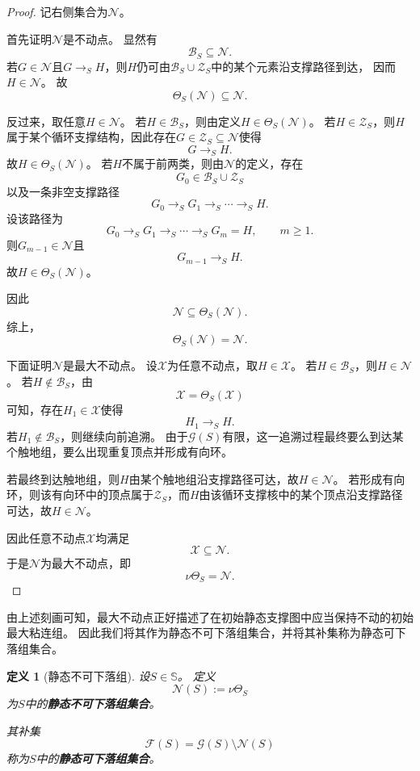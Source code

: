 \documentclass[UTF8,fontset=none]{ctexart}
\theoremstyle{cnthm}
\newtheorem{definition}{定义}[section]
\begin{document}
			\begin{proof}
				记右侧集合为$\mathcal{N}$。
				
				首先证明$\mathcal{N}$是不动点。
				显然有
				$$
				\mathcal{B}_S\subseteq\mathcal{N}.
				$$
				若$G\in\mathcal{N}$且$G\to_S H$，则$H$仍可由$\mathcal{B}_S\cup\mathcal{Z}_S$中的某个元素沿支撑路径到达，
				因而$H\in\mathcal{N}$。
				故
				$$
				\Theta_S(\mathcal{N})\subseteq\mathcal{N}.
				$$
				
				反过来，取任意$H\in\mathcal{N}$。
				若$H\in\mathcal{B}_S$，则由定义$H\in\Theta_S(\mathcal{N})$。
				若$H\in\mathcal{Z}_S$，则$H$属于某个循环支撑结构，因此存在$G\in\mathcal{Z}_S\subseteq\mathcal{N}$使得
				$$
				G\to_S H.
				$$
				故$H\in\Theta_S(\mathcal{N})$。
				若$H$不属于前两类，则由$\mathcal{N}$的定义，存在
				$$
				G_0\in\mathcal{B}_S\cup\mathcal{Z}_S
				$$
				以及一条非空支撑路径
				$$
				G_0\to_S G_1\to_S\cdots\to_S H.
				$$
				设该路径为
				$$
				G_0\to_S G_1\to_S\cdots\to_S G_m=H,
				\qquad m\geq 1.
				$$
				则$G_{m-1}\in\mathcal{N}$且
				$$
				G_{m-1}\to_S H.
				$$
				故$H\in\Theta_S(\mathcal{N})$。
				
				因此
				$$
				\mathcal{N}\subseteq\Theta_S(\mathcal{N}).
				$$
				综上，
				$$
				\Theta_S(\mathcal{N})=\mathcal{N}.
				$$
				
				下面证明$\mathcal{N}$是最大不动点。
				设$\mathcal{X}$为任意不动点，取$H\in\mathcal{X}$。
				若$H\in\mathcal{B}_S$，则$H\in\mathcal{N}$。
				若$H\notin\mathcal{B}_S$，由
				$$
				\mathcal{X}=\Theta_S(\mathcal{X})
				$$
				可知，存在$H_1\in\mathcal{X}$使得
				$$
				H_1\to_S H.
				$$
				若$H_1\notin\mathcal{B}_S$，则继续向前追溯。
				由于$\mathcal{G}(S)$有限，这一追溯过程最终要么到达某个触地组，要么出现重复顶点并形成有向环。
				
				若最终到达触地组，则$H$由某个触地组沿支撑路径可达，故$H\in\mathcal{N}$。
				若形成有向环，则该有向环中的顶点属于$\mathcal{Z}_S$，而$H$由该循环支撑核中的某个顶点沿支撑路径可达，故$H\in\mathcal{N}$。
				
				因此任意不动点$\mathcal{X}$均满足
				$$
				\mathcal{X}\subseteq\mathcal{N}.
				$$
				于是$\mathcal{N}$为最大不动点，即
				$$
				\nu\Theta_S=\mathcal{N}.
				$$
			\end{proof}
			
			由上述刻画可知，最大不动点正好描述了在初始静态支撑图中应当保持不动的初始最大粘连组。			
			因此我们将其作为静态不可下落组集合，并将其补集称为静态可下落组集合。
			
			\begin{definition}[静态不可下落组]
				设$S\in\mathbb{S}$。
				定义
				$$
				\mathcal{N}(S):=\nu\Theta_S
				$$
				为$S$中的\textbf{静态不可下落组集合}。
				
				其补集
				$$
				\mathcal{F}(S)
				=
				\mathcal{G}(S)\setminus \mathcal{N}(S)
				$$
				称为$S$中的\textbf{静态可下落组集合}。
			\end{definition}
			
\end{document}
